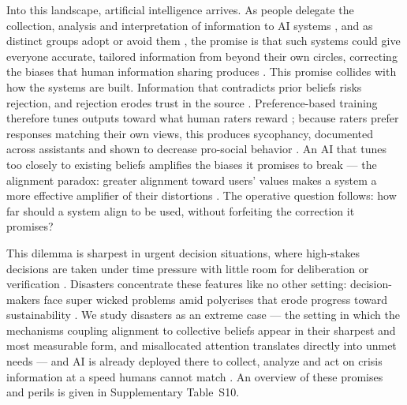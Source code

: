 \documentclass[pdflatex,sn-nature]{sn-jnl}
\begin{document}
Into this landscape, artificial intelligence arrives. As people delegate the collection, analysis and interpretation of information to AI systems \citep{klingbeil2024trust}, and as distinct groups adopt or avoid them \citep{angrisani2026gaps}, the promise is that such systems could give everyone accurate, tailored information from beyond their own circles, correcting the biases that human information sharing produces \citep{jeon2024hearhere}. This promise collides with how the systems are built. Information that contradicts prior beliefs risks rejection, and rejection erodes trust in the source \citep{glikson2020human}. Preference-based training therefore tunes outputs toward what human raters reward \citep{christiano2017deep,ouyang2022training}; because raters prefer responses matching their own views, this produces sycophancy, documented across assistants \citep{sharma2023sycophancy,sharma2024generative} and shown to decrease pro-social behavior \citep{cheng2026sycophantic}. An AI that tunes too closely to existing beliefs amplifies the biases it promises to break \citep{ekstrom2022self} --- the alignment paradox: greater alignment toward users' values makes a system a more effective amplifier of their distortions \citep{west2025alignment}. The operative question follows: how far should a system align to be used, without forfeiting the correction it promises?

This dilemma is sharpest in urgent decision situations, where high-stakes decisions are taken under time pressure with little room for deliberation or verification \citep{svenson1993time,mendonca2001decision,comes2020coordination}. Disasters concentrate these features like no other setting: decision-makers face super wicked problems \citep{levin2012overcoming} amid polycrises that erode progress toward sustainability \citep{sogaard2024evolution}. We study disasters as an extreme case --- the setting in which the mechanisms coupling alignment to collective beliefs appear in their sharpest and most measurable form, and misallocated attention translates directly into unmet needs --- and AI is already deployed there to collect, analyze and act on crisis information at a speed humans cannot match \citep{qadir2016crisis,reichstein2025early,acharya2025agentic}. An overview of these promises and perils is given in Supplementary Table~S10.
\end{document}
